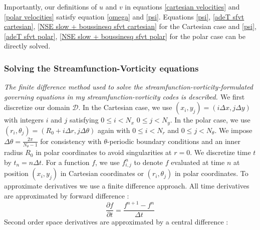 \documentclass{article}
\begin{document}
Importantly, our definitions of $u$ and $v$ in equations \ref{cartesian velocities} and \ref{polar velocities} satisfy equation \ref{omega} and \ref{psi}. Equations \ref{psi}, \ref{adeT sfvt cartesian}, \ref{NSE slow + boussinesq sfvt cartesian} for the Cartesian case and \ref{psi}, \ref{adeT sfvt polar}, \ref{NSE slow + boussinesq sfvt polar} for the polar case can be directly solved.

\subsubsection*{Solving the Streamfunction-Vorticity equations}
{\it{The finite difference method used to solve the streamfunction-vorticity-formulated governing equations in my streamfunction-vorticity codes is described. }}
\vspace{0.3cm}
\newline
\noindent We first discretize our domain $\mathcal{D}$. In the Cartesian case, we use $(x_i,y_j)=(i \Delta x, j \Delta y)
$ with integers $i$ and $j$ satisfying $0\leq i < N_x$ $0 \leq j < N_y$. In the polar case, we use $(r_i, \theta_j)= (R_0 
+ i \Delta r, j 
\Delta \theta)$ again with  $0 \leq i < N_r$ and $0 \leq j < N_{\theta}$. We impose $\Delta \theta = \frac{2 \pi}
{N_{\theta} - 1}$ for consistency with $\theta$-periodic boundary conditions and an inner radius $R_0$ in polar 
coordinates to avoid 
singularities at $r=0$. We discretize time $t$ by $t_n = n \Delta t$. For a function $f$, we use 
$f^n_{i,j}$ to denote $f$ evaluated at time $n$ at position $(x_i,y_j)$ in Cartesian coordinates or $(r_i, \theta_j)$ in 
polar coordinates. 
\newline
To approximate derivatives we use a finite difference approach. All time derivatives are approximated by forward difference \cite{press1986numerical}:
\begin{equation}
	\frac{\partial f}{\partial t} = \frac{f^{n+1} - f^{n}}{\Delta t}
	\label{forward time difference}
\end{equation}
Second order space derivatives are approximated by a central difference \cite{press1986numerical}:
\end{document}
